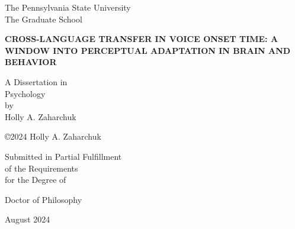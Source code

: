 \documentclass[
  12pt,
  twoside]{article}
\author{}
\date{\vspace{-2.5em}}
\begin{document}
\thispagestyle{empty}

\begin{centering}

The Pennsylvania State University\\
The Graduate School

\vspace{3 cm}

\MakeUppercase{\bf Cross-language transfer in voice onset time: A window into perceptual adaptation in brain and behavior}

\vspace{3 cm}

A Dissertation in\\
Psychology\\
by\\
Holly A. Zaharchuk

\vspace{1.5 cm}

\copyright 2024 Holly A. Zaharchuk

\vspace{1.5 cm}

Submitted in Partial Fulfillment\\
of the Requirements\\
for the Degree of\\

\vspace{0.75 cm}

Doctor of Philosophy

\vspace{0.75 cm}

August 2024

\end{centering}

\newpage
\end{document}
